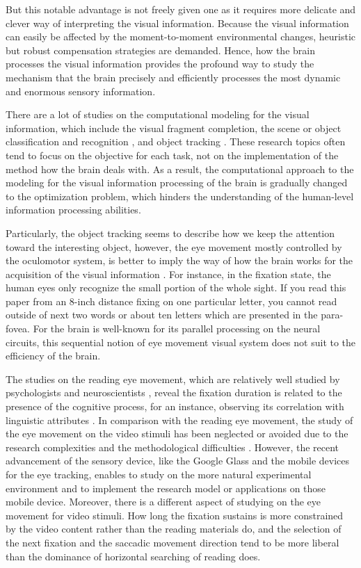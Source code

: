 \documentclass[10pt,letterpaper]{article}
\begin{document}
But this notable advantage is not freely given one as it requires more delicate and clever way of interpreting the visual information. Because the visual information can easily be affected by the moment-to-moment environmental changes, heuristic but robust compensation strategies are demanded. Hence, how the brain processes the visual information provides the profound way to study the mechanism that the brain precisely and efficiently processes the most dynamic and enormous sensory information.

There are a lot of studies on the computational modeling for the visual information, which include the visual fragment completion, the scene or object classification and recognition \cite{winn2005,lazebnik2006}, and object tracking \cite{YiWu2013}. These research topics often tend to focus on the objective for each task, not on the implementation of the method how the brain deals with. As a result, the computational approach to the modeling for the visual information processing of the brain is gradually changed to the optimization problem, which hinders the understanding of the human-level information processing abilities. 

Particularly, the object tracking seems to describe how we keep the attention toward the interesting object, however, the eye movement mostly controlled by the oculomotor system, is better to imply the way of how the brain works for the acquisition of the visual information \cite{Henderson2003}. For instance, in the fixation state, the human eyes only recognize the small portion of the whole sight. If you read this paper from an 8-inch distance fixing on one particular letter, you cannot read outside of next two words or about ten letters which are presented in the para-fovea. For the brain is well-known for its parallel processing on the neural circuits, this sequential notion of eye movement visual system does not suit to the efficiency of the brain.

The studies on the reading eye movement, which are relatively well studied by psychologists and neuroscientists \cite{Rayner1998,Reichle1998}, reveal the fixation duration is related to the presence of the cognitive process, for an instance, observing its correlation with linguistic attributes \cite{Inhoff1986,Rayner1986}. In comparison with the reading eye movement, the study of the eye movement on the video stimuli has been neglected or avoided due to the research complexities and the methodological difficulties \cite{Tatler2011}. However, the recent advancement of the sensory device, like the Google Glass and the mobile devices for the eye tracking, enables to study on the more natural experimental environment and to implement the research model or applications on those mobile device. Moreover, there is a different aspect of studying on the eye movement for video stimuli. How long the fixation sustains is more constrained by the video content rather than the reading materials do, and the selection of the next fixation and the saccadic movement direction tend to be more liberal than the dominance of horizontal searching of reading does. 
\end{document}
